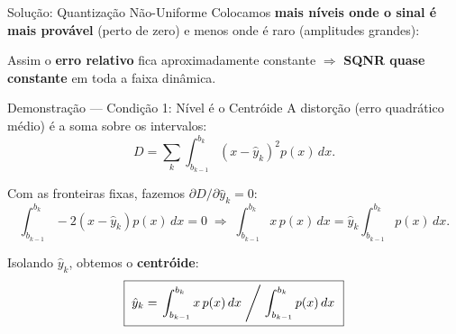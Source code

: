 \begin{frame}{Solução: Quantização Não-Uniforme}
  Colocamos \textbf{mais níveis onde o sinal é mais provável} (perto de
  zero) e menos onde é raro (amplitudes grandes):

  \vspace{0.1cm}
  \begin{center}
  \end{center}

  \vspace{0.05cm}
  {\footnotesize Assim o \textbf{erro relativo} fica aproximadamente
  constante $\Rightarrow$ \textbf{SQNR quase constante} em toda a faixa
  dinâmica.}
\end{frame}


\begin{frame}{Demonstração — Condição 1: Nível é o Centróide}
  A distorção (erro quadrático médio) é a soma sobre os intervalos:
  \[
    D = \sum_{k} \int_{b_{k-1}}^{b_k} \left(x - \hat{y}_k\right)^2 p(x)\,dx.
  \]

  Com as fronteiras fixas, fazemos $\partial D / \partial \hat{y}_k = 0$:
  \[
    \int_{b_{k-1}}^{b_k} -2\left(x - \hat{y}_k\right) p(x)\,dx = 0
    \;\Longrightarrow\;
    \int_{b_{k-1}}^{b_k}\! x\,p(x)\,dx = \hat{y}_k \int_{b_{k-1}}^{b_k}\! p(x)\,dx.
  \]

  Isolando $\hat{y}_k$, obtemos o \textbf{centróide}:
  \[
    \boxed{\;\hat{y}_k = \left.\int_{b_{k-1}}^{b_k} x\,p(x)\,dx \;\middle/\;
             \int_{b_{k-1}}^{b_k} p(x)\,dx\;\right.}
  \]
\end{frame}

